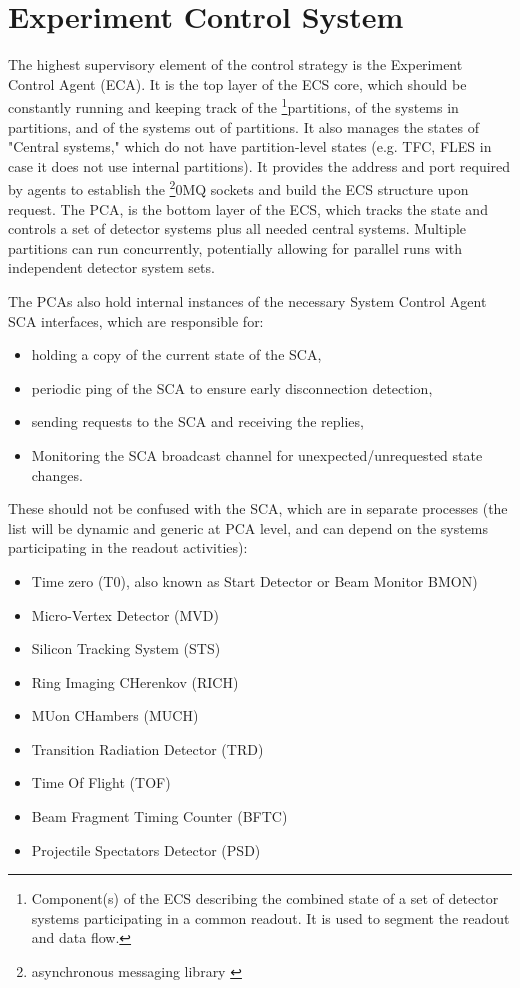 \section{Experiment Control System}\label{sssAgents}

The highest supervisory element of the control strategy is the Experiment Control Agent 
(\gls{ECA}). It is the top layer of the \gls{ECS} core, which should be constantly running and keeping track of the \footnote{Component(s) of the \gls{ECS} describing the combined state of a set of detector systems participating in a common readout. It is used to segment the readout and data flow.}{partitions}, of the systems in partitions, and of the systems out of partitions. It also manages the states of "Central systems," which do not have partition-level states (e.g. \gls{TFC}, \gls{FLES} in case it does not use internal partitions).  It provides the address and port required by agents to establish the \footnote{asynchronous messaging library \cite{zeromq}}{0MQ} sockets and build the \gls{ECS} structure upon request. The \gls{PCA}, is the bottom layer of the \gls{ECS}, which tracks the state and controls a set of detector systems plus all needed central systems. Multiple partitions can run concurrently, potentially allowing for parallel runs with independent detector system sets. 

The \glspl{PCA} also hold internal instances of the necessary System Control Agent \gls{SCA} interfaces, which are responsible for:
\begin{itemize}
 \item holding a copy of the current state of the \gls{SCA},
 \item periodic ping of the \gls{SCA} to ensure early disconnection detection,
 \item sending requests to the \gls{SCA} and receiving the replies,
 \item Monitoring the \gls{SCA} broadcast channel for unexpected/unrequested state changes.
\end{itemize}
These should not be confused with the \gls{SCA}, which are in separate processes (the list will be dynamic and generic at \gls{PCA} level, and can depend on the systems participating in the readout activities):

\begin{itemize}
 \item Time zero (T0), also known as Start Detector or Beam Monitor \gls{BMON})
 \item Micro-Vertex Detector (\gls{MVD})
 \item Silicon Tracking System (\gls{STS})
 \item Ring Imaging CHerenkov (\gls{RICH})
 \item MUon CHambers (\gls{MUCH})
 \item Transition Radiation Detector (\gls{TRD})
 \item Time Of Flight (\gls{TOF})
 \item Beam Fragment Timing Counter (\gls{BFTC})
 \item Projectile Spectators Detector (\gls{PSD})
\end{itemize}


